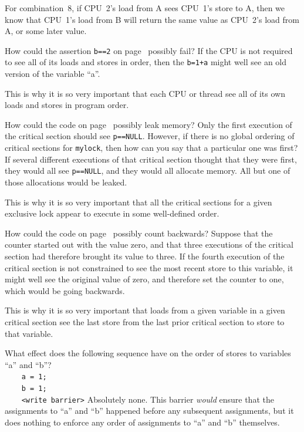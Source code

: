 	For combination~8, if CPU~2's load from A sees CPU~1's store
	to A, then we know that CPU~1's load from B will return the same
	value as CPU~2's load from A, or some later value.

\QuickQ{}
	How could the assertion {\tt b==2} on
	page~\pageref{codesample:advsync:What Can You Count On? 1}
	possibly fail?
\QuickA{}
	If the CPU is not required to see all of its loads and
	stores in order, then the {\tt b=1+a} might well see an
	old version of the variable ``a''.

	This is why it is so very important that each CPU or thread
	see all of its own loads and stores in program order.

\QuickQ{}
	How could the code on
	page~\pageref{codesample:advsync:What Can You Count On? 2}
	possibly leak memory?
\QuickA{}
	Only the first execution of the critical section should
	see {\tt p==NULL}.
	However, if there is no global ordering of critical sections for
	{\tt mylock}, then how can you say that a particular one was
	first?
	If several different executions of that critical section thought
	that they were first, they would all see {\tt p==NULL}, and
	they would all allocate memory.
	All but one of those allocations would be leaked.

	This is why it is so very important that all the critical sections
	for a given exclusive lock appear to execute in some well-defined
	order.

\QuickQ{}
	How could the code on
	page~\pageref{codesample:advsync:What Can You Count On? 2}
	possibly count backwards?
\QuickA{}
	Suppose that the counter started out with the value zero,
	and that three executions of the critical section had therefore
	brought its value to three.
	If the fourth execution of the critical section is not constrained
	to see the most recent store to this variable, it might well see
	the original value of zero, and therefore set the counter to
	one, which would be going backwards.

	This is why it is so very important that loads from a given variable
	in a given critical
	section see the last store from the last prior critical section to
	store to that variable.

\QuickQ{}
	What effect does the following sequence have on the
	order of stores to variables ``a'' and ``b''? \\
	{\tt ~~~~a = 1;} \\
	{\tt ~~~~b = 1;} \\
	{\tt ~~~~<write barrier>}
\QuickA{}
	Absolutely none.  This barrier {\em would} ensure that the
	assignments to ``a'' and ``b'' happened before any subsequent
	assignments, but it does nothing to enforce any order of
	assignments to ``a'' and ``b'' themselves.

